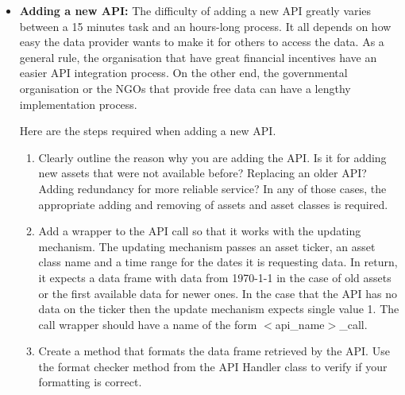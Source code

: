 \documentclass[main.tex]{subfiles}
\begin{document}
\begin{itemize}
    \item \textbf{Adding a new API: \newline}
        The difficulty of adding a new API greatly varies between a 15 minutes task and an hours-long process. It all depends on how easy the data provider wants to make it for others to access the data. As a general rule, the organisation that have great financial incentives have an easier API integration process. On the other end, the governmental organisation or the NGOs that provide free data can have a lengthy implementation process.
        
        Here are the steps required when adding a new API. 
        \begin{enumerate}
            \item Clearly outline the reason why you are adding the API. Is it for adding new assets that were not available before? Replacing an older API? Adding redundancy for more reliable service?
            In any of those cases, the appropriate adding and removing of assets and asset classes is required.
            \item Add a wrapper to the API call so that it works with the updating mechanism. The updating mechanism passes an asset ticker, an asset class name and a time range for the dates it is requesting data. In return, it expects a data frame with data from 1970-1-1 in the case of old assets or the first available data for newer ones. In the case that the API has no data on the ticker then the update mechanism expects single value 1. The call wrapper should have a name of the form $<$api\_name$>$\_call. 
            \item Create a method that formats the data frame retrieved by the API. Use the format checker method from the API Handler class to verify if your formatting is correct. 
        \end{enumerate}
    

\end{itemize}
\end{document}
